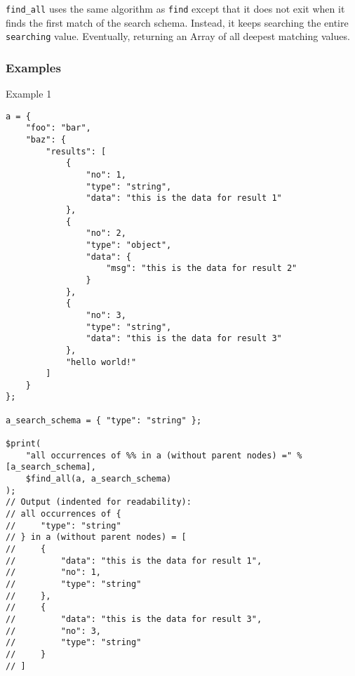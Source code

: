 \verb|find_all| uses the same algorithm as \verb|find| except that it does not exit when it finds the first match of the search schema. Instead, it keeps searching the entire \verb|searching| value. Eventually, returning an Array of all deepest matching values.

\subsubsection{Examples}

\begin{center}
    Example 1
\begin{verbatim}
a = {
    "foo": "bar",
    "baz": {
        "results": [
            {
                "no": 1,
                "type": "string",
                "data": "this is the data for result 1"
            },
            {
                "no": 2,
                "type": "object",
                "data": {
                    "msg": "this is the data for result 2"
                }
            },
            {
                "no": 3,
                "type": "string",
                "data": "this is the data for result 3"
            },
            "hello world!"
        ]
    }
};

a_search_schema = { "type": "string" };

$print(
    "all occurrences of %% in a (without parent nodes) =" % [a_search_schema],
    $find_all(a, a_search_schema)
);
// Output (indented for readability):
// all occurrences of {
//     "type": "string"
// } in a (without parent nodes) = [
//     {
//         "data": "this is the data for result 1",
//         "no": 1,
//         "type": "string"
//     },
//     {
//         "data": "this is the data for result 3",
//         "no": 3,
//         "type": "string"
//     }
// ]
\end{verbatim}
\end{center}

